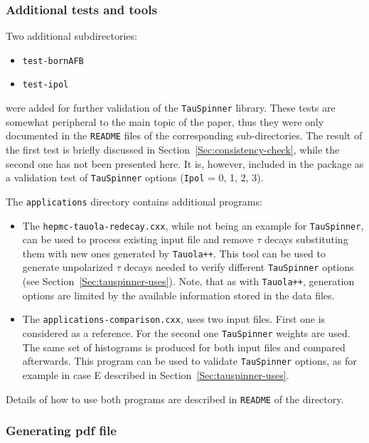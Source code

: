 \documentclass{article}
\begin{document}
\subsubsection{Additional tests and tools}\label{Sec:Installation-tools}

Two additional subdirectories:
\begin{itemize}
\item 
{\tt test-bornAFB} 
\item {\tt test-ipol} 
\end{itemize}
were added for further  validation
of the {\tt TauSpinner} library. These tests are somewhat peripheral to the main topic of the paper,
thus they were only documented in the {\tt README} files of the corresponding sub-directories.
The result of the first test is briefly discussed in Section~\ref{Sec:consistency-check}, while
the second one has not been presented here. It is, however, included in the package as a validation test
of  {\tt TauSpinner} options ({\tt Ipol} = 0, 1, 2, 3).

The {\tt applications} directory contains additional programs:
\begin{itemize}
\item
The {\tt hepmc-tauola-redecay.cxx}, while not being an example for {\tt TauSpinner}, can be used to
process existing input file and remove $\tau$ decays substituting them with new ones generated by
{\tt Tauola++}. This tool can be used to generate unpolarized $\tau$ decays needed to verify different
{\tt TauSpinner} options (see Section~\ref{Sec:tauspinner-uses}). Note, that as with
{\tt Tauola++}, generation options are limited by the available information stored in the data files.
\item
The {\tt applications-comparison.cxx}, uses two input files.  First one  is considered  
as a reference. For the second one  {\tt TauSpinner} weights are used. 
The same set of histograms is produced for both input files and compared afterwards.
This program can be used to validate {\tt TauSpinner} options, as for example in case E described in Section~\ref{Sec:tauspinner-uses}.
\end{itemize}

Details of how to use both programs are described in {\tt README} of the directory.

\subsubsection{Generating pdf file}
\end{document}
